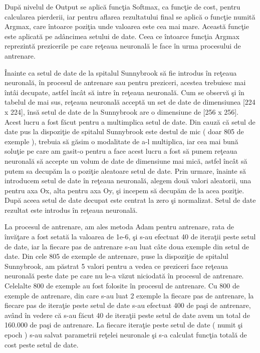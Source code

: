 \par

Dup\u{a} nivelul de Output se aplic\u{a} func\c{t}ia Softmax, ca func\c{t}ie de cost, pentru calcularea pierderii, iar pentru aflarea rezultatului final se aplic\u{a} o func\c{t}ie numit\u{a} Argmax, care \^{i}ntoarce pozi\c{t}ia unde valoarea este cea mai mare. Aceast\u{a} func\c{t}ie este aplicat\u{a} pe ad\^{a}ncimea setului de date. Ceea ce \^{i}ntoarce func\c{t}ia Argmax reprezint\u{a} prezicerile pe care re\c{t}eaua neuronal\u{a} le face \^{i}n urma procesului de antrenare.

\par

\^{I}nainte ca setul de date de la spitalul Sunnybrook s\u{a} fie introdus \^{i}n re\c{t}eaua neuronal\u{a}, \^{i}n procesul de antrenare sau pentru preziceri, acestea trebuiesc mai \^{i}nt\^{a}i decupate, astfel \^{i}nc\^{a}t s\u{a} intre \^{i}n re\c{t}eaua neuronal\u{a}. Cum se observ\u{a} \c{s}i \^{i}n tabelul de mai sus, re\c{t}eaua neuronal\u{a} accept\u{a} un set de date de dimensiunea [224 x 224], \^{i}ns\u{a} setul de date de la Sunnybrook are o dimensiune de [256 x 256]. Acest lucru a fost f\u{a}cut pentru a multimplica setul de date. Din cauz\u{a} c\u{a} setul de date pus la dispozi\c{t}ie de spitalul Sunnybrook este destul de mic ( doar 805 de exemple ), trebuia s\u{a} g\u{a}sim o modalitate de a-l multiplica, iar cea mai bun\u{a} solu\c{t}ie pe care am gasit-o pentru a face acest lucru a fost s\u{a} punem re\c{t}eaua neuronal\u{a} s\u{a} accepte un volum de date de dimensiune mai mic\u{a}, astfel \^{i}nc\^{a}t s\u{a} putem sa decup\u{a}m la o pozi\c{t}ie aleatoare setul de date. Prin urmare, \^{i}nainte s\u{a} introducem setul de date \^{i}n re\c{t}eaua neuronal\u{a}, alegem dou\u{a} valori aleatorii, una pentru axa Ox, alta pentru axa Oy, \c{s}i incepem s\u{a} decup\u{a}m de la acea pozi\c{t}ie. Dup\u{a} aceea setul de date  decupat este centrat la zero \c{s}i normalizat. Setul de date rezultat este introdus \^{i}n re\c{t}eaua neuronal\u{a}.

\par

La procesul de antrenare,  am ales metoda Adam pentru antrenare, rata de \^{i}nv\u{a}\c{t}are a fost setat\u{a} la valoarea de 1e-6, \c{s}i s-au efectuat 40 de itera\c{t}ii peste setul de date, iar la fiecare pas de antrenare s-au luat c\^{a}te doua exemple din setul de date. Din cele 805 de exemple de antrenare, puse la dispozi\c{t}ie de spitalul Sunnybrook, am p\u{a}strat 5 valori pentru a vedea ce preziceri face re\c{t}eaua neuronal\u{a} peste date pe care nu le-a v\u{a}zut niciodat\u{a} \^{i}n procesul de antrenare. Celelalte 800 de exemple au fost folosite \^{i}n procesul de antrenare. Cu 800 de exemple de antrenare, din care s-au luat 2 exemple la fiecare pas de antrenare, la fiecare pas de itera\c{t}ie peste setul de date s-au efectuat 400 de pa\c{s}i de antrenare, av\^{a}nd \^{i}n vedere c\u{a} s-au f\u{a}cut 40 de itera\c{t}ii peste setul de date avem un total de 160.000 de pa\c{s}i de antrenare. La fiecare itera\c{t}ie peste setul de date ( numit \c{s}i epoch ) s-au salvat parametrii re\c{t}elei neuronale \c{s}i s-a calculat func\c{t}ia total\u{a} de cost peste setul de date.

